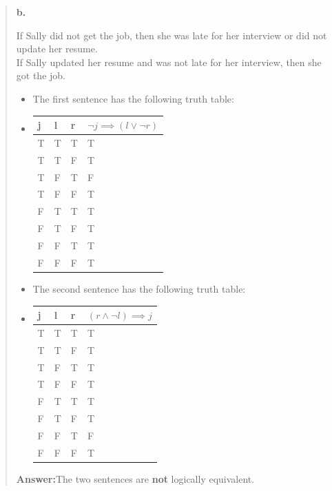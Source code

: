 \documentclass[11pt, oneside]{article}
\begin{document}
\begin{quote}
    \textbf{b. }
    
    If Sally did not get the job, then she was late for her interview or did not update her resume. \\
    If Sally updated her resume and was not late for her interview, then she got the job.

    \begin{itemize}
        \item The first sentence has the following truth table:
        \item
            \begin{tabular}{ |p{0.5cm}|p{0.5cm}|p{0.5cm}|p{3cm}|  }
                \hline
                j & l & r & $\neg j \implies (l \lor \neg r)$ \\
                \hline
                T & T & T & T \\
                T & T & F & T \\
                T & F & T & F \\
                T & F & F & T \\
                F & T & T & T \\
                F & T & F & T \\
                F & F & T & T \\
                F & F & F & T \\
                \hline
            \end{tabular}
        \item The second sentence has the following truth table:
        \item
            \begin{tabular}{ |p{0.5cm}|p{0.5cm}|p{0.5cm}|p{3cm}|  }
                \hline
                j & l & r & $(r \land \neg l) \implies j$ \\
                \hline
                T & T & T & T \\
                T & T & F & T \\
                T & F & T & T \\
                T & F & F & T \\
                F & T & T & T \\
                F & T & F & T \\
                F & F & T & F \\
                F & F & F & T \\
                \hline
            \end{tabular}
    \end{itemize}

    \textbf{Answer:}\enspace The two sentences are \textbf{not} logically equivalent.
\end{quote}
\end{document}
